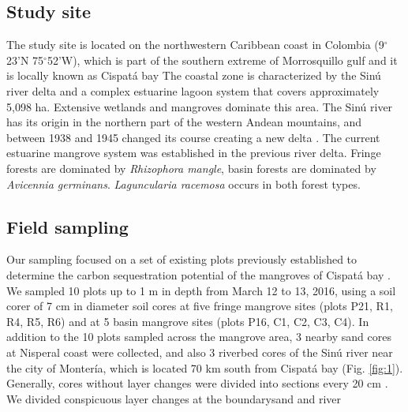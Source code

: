 \subsection{Study site}
The study site is located on the northwestern Caribbean coast in Colombia (9$^{\circ}$23'N 75$^{\circ}$52'W), which is part of the southern extreme of Morrosquillo gulf and it is locally known as Cispat\'a bay \DIFdelbegin {}\DIFdelend \DIFaddbegin {}\DIFaddend The coastal zone is characterized by the Sin\'{u} river delta and a complex estuarine lagoon system that covers approximately 5,098 ha. Extensive wetlands and mangroves dominate this area. The Sin\'{u} river has its origin in the northern part of the western Andean mountains, and between 1938 and 1945 changed its course creating a new delta \citep{suarez2004}. The current estuarine mangrove system was established in the previous river delta. 
Fringe forests are dominated by  \textit{Rhizophora mangle}, basin forests are dominated by \textit{Avicennia germinans}. \textit{Laguncularia racemosa} occurs in both forest types.


\subsection{Field sampling}
Our sampling focused on a set of existing plots previously established to determine the carbon sequestration potential of the mangroves of Cispat\'a bay \citep{Bolivar2015}. We sampled 10 plots \DIFaddbegin {}\DIFaddend up to 1 m in depth from March 12 to 13, 2016, using a soil corer of 7 cm in diameter \DIFdelbegin {}\DIFdelend \DIFaddbegin {}\DIFaddend soil cores at five fringe mangrove sites (plots P21, R1, R4, R5, R6) and at 5  basin mangrove sites (plots P16, C1, C2, C3, C4). In addition to the 10 plots sampled across the mangrove area, 3 nearby sand cores at Nisperal coast were collected, and also 3 riverbed cores of the Sin\'{u} river near the city of Monter\'{i}a, which is located 70 km south from Cispat\'{a} bay (Fig. \ref{fig:1}). \DIFaddbegin {}\DIFaddend Generally, cores without layer changes were divided into sections every 20 cm \DIFaddbegin {}\DIFaddend . We divided conspicuous layer changes at the boundary\DIFdelbegin {}\DIFdelend \DIFaddbegin {}\DIFaddend sand and river \DIFdelbegin {}%
\DIFdelend \DIFaddbegin {}

